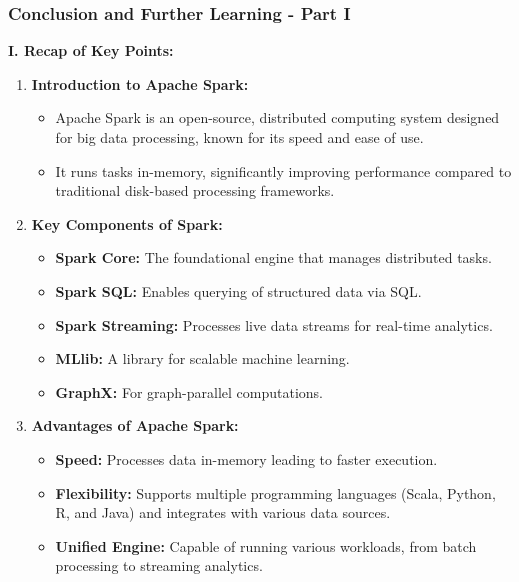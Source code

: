 \documentclass[aspectratio=169]{beamer}
\begin{document}
\begin{frame}[fragile]
    \frametitle{Conclusion and Further Learning - Part I}
    \textbf{I. Recap of Key Points:}
    \begin{enumerate}
        \item \textbf{Introduction to Apache Spark:}
        \begin{itemize}
            \item Apache Spark is an open-source, distributed computing system designed for big data processing, known for its speed and ease of use.
            \item It runs tasks in-memory, significantly improving performance compared to traditional disk-based processing frameworks.
        \end{itemize}
        
        \item \textbf{Key Components of Spark:}
        \begin{itemize}
            \item \textbf{Spark Core:} The foundational engine that manages distributed tasks.
            \item \textbf{Spark SQL:} Enables querying of structured data via SQL.
            \item \textbf{Spark Streaming:} Processes live data streams for real-time analytics.
            \item \textbf{MLlib:} A library for scalable machine learning.
            \item \textbf{GraphX:} For graph-parallel computations.
        \end{itemize}
        
        \item \textbf{Advantages of Apache Spark:}
        \begin{itemize}
            \item \textbf{Speed:} Processes data in-memory leading to faster execution.
            \item \textbf{Flexibility:} Supports multiple programming languages (Scala, Python, R, and Java) and integrates with various data sources.
            \item \textbf{Unified Engine:} Capable of running various workloads, from batch processing to streaming analytics.
        \end{itemize}
    \end{enumerate}
\end{frame}
\end{document}
